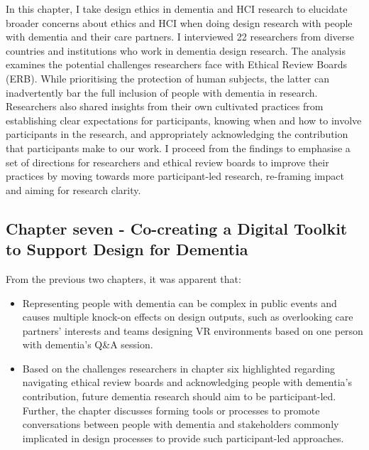 In this chapter, I take design ethics in dementia and HCI research to elucidate broader concerns about ethics and HCI when doing design research with people with dementia and their care partners. I interviewed 22 researchers from diverse countries and institutions who work in dementia design research. The analysis examines the potential challenges researchers face with Ethical Review Boards (ERB). While prioritising the protection of human subjects, the latter can inadvertently bar the full inclusion of people with dementia in research. Researchers also shared insights from their own cultivated practices from establishing clear expectations for participants, knowing when and how to involve participants in the research, and appropriately acknowledging the contribution that participants make to our work. I proceed from the findings to emphasise a set of directions for researchers and ethical review boards to improve their practices by moving towards more participant-led research, re-framing impact and aiming for research clarity.

\subsection{Chapter seven - Co-creating a Digital Toolkit to Support Design for Dementia}
\label{Intro:ChapterSeven}
From the previous two chapters, it was apparent that: 
\begin{itemize}
\item Representing people with dementia can be complex in public events and causes multiple knock-on effects on design outputs, such as overlooking care partners' interests and teams designing VR environments based on one person with dementia's Q\&A session.

\item Based on the challenges researchers in chapter six highlighted regarding navigating ethical review boards and acknowledging people with dementia's contribution, future dementia research should aim to be participant-led. Further, the chapter discusses forming tools or processes to promote conversations between people with dementia and stakeholders commonly implicated in design processes to provide such participant-led approaches.
\end{itemize}

